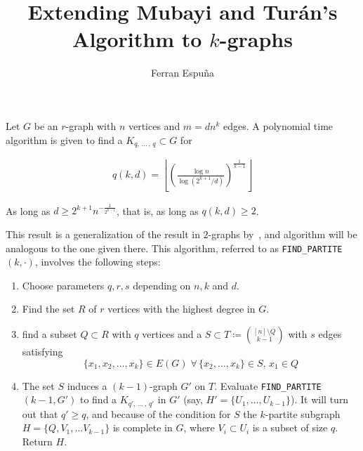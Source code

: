 \documentclass[12pt]{article}
\author{Ferran Espuña}
\date{} %
\begin{document}
    \title{Extending Mubayi and Turán's Algorithm to $k$-graphs}

    \maketitle

    Let $G$ be an $r$-graph with $n$ vertices and $m = dn^k$ edges.
    A polynomial time algorithm is given to find a $K_{q,\, \ldots\, ,\, q} \subset G$ for

    \begin{align*}
        q (k, d) = \left\lfloor \left(  \frac{\log n}{\log (2^{k+1}/d)} \right)^{\frac{1}{k-1}} \right\rfloor
        \label{eq:q}
    \end{align*}

    As long as $d \geq 2^{k+1} n^{-\frac{1}{2^{k-1}}}$, that is, as long as $q(k, d) \geq 2$.

    This result is a generalization of the result in $2$-graphs by~\cite{MUBAYI2010174},
    and algorithm will be analogous to the one given there.
    This algorithm, referred to as \verb|FIND_PARTITE|$(k, \cdot)$, involves the following steps:

    \begin{enumerate}
        \item Choose parameters $q, r, s$ depending on $n, k$ and $d$. \label{step:choose_parameters}

        \item Find the set $R$ of $r$ vertices with the highest degree in $G$. \label{step:find_R}

        \item find a subset $Q \subset R$ with $q$ vertices and a
        $S \subset T \coloneqq \binom{[n] \setminus Q}{k-1}$ with $s$ edges satisfying
        \[\{x_1, x_2, \ldots, x_k\} \in E(G) \; \forall \, \{x_2, \ldots, x_k\} \in S, \, x_1 \in Q\] \label{step:find_Q_S}

        \item The set $S$ induces a $(k-1)$-graph $G'$ on $T$.
        Evaluate \verb|FIND_PARTITE|$(k-1, G')$ to find a $K_{q',\, \ldots\, ,\, q'}$ in $G'$
        (say, $H' = \{U_1, \ldots, U_{k-1}\}$). It will turn out that $q' \geq q$,
        and because of the condition for $S$ the $k$-partite subgraph $H = \{Q, V_1, \ldots V_{k-1}\}$
        is complete in $G$, where $V_i \subset U_i$ is a subset of size $q$.
        Return $H$.

    \end{enumerate}
\end{document}
